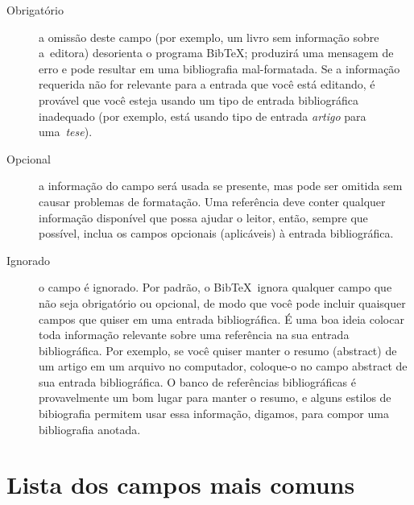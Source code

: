 \documentclass[article,openany]{memoir}
\begin{document}
\begin{description}
\item[Obrigatório]
a omissão deste campo (por exemplo, um livro sem informação sobre
a~editora) desorienta o programa Bib\TeX; produzirá uma mensagem de
erro e pode resultar em uma bibliografia mal-formatada. Se a
informação requerida não for relevante para a entrada que você está
editando, é provável que você esteja usando um tipo de entrada
bibliográfica inadequado (por exemplo, está usando tipo de entrada
\emph{artigo} para uma~\emph{tese}).


\item[Opcional]
a informação do campo será usada se presente, mas pode ser omitida sem
causar problemas de formatação. Uma referência deve conter qualquer
informação disponível que possa ajudar o leitor, então, sempre que
possível, inclua os campos opcionais (aplicáveis) à entrada
bibliográfica.


\item[Ignorado] o campo é ignorado. Por padrão, o Bib\TeX\ ignora qualquer
campo que não seja obrigatório ou opcional, de modo que você pode
incluir quaisquer campos que quiser em uma entrada bibliográfica. É
uma boa ideia colocar toda informação relevante sobre uma referência
na sua entrada bibliográfica. Por exemplo, se você quiser manter o
resumo (abstract) de um artigo em um arquivo no computador, coloque-o
no campo abstract de sua entrada bibliográfica. O banco de referências
bibliográficas é provavelmente um bom lugar para manter o resumo, e
alguns estilos de bibiografia permitem usar essa informação, digamos,
para compor uma bibliografia anotada.
\end{description}

\section{Lista dos campos mais comuns}
\end{document}
